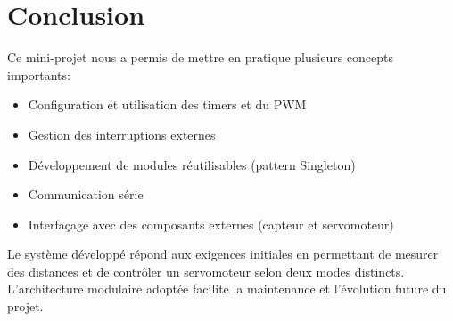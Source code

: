 \section{Conclusion}
Ce mini-projet nous a permis de mettre en pratique plusieurs concepts importants:
\begin{itemize}
    \item Configuration et utilisation des timers et du PWM
    \item Gestion des interruptions externes
    \item Développement de modules réutilisables (pattern Singleton)
    \item Communication série
    \item Interfaçage avec des composants externes (capteur et servomoteur)
\end{itemize}

Le système développé répond aux exigences initiales en permettant de mesurer des distances et de contrôler un servomoteur selon deux modes distincts. L'architecture modulaire adoptée facilite la maintenance et l'évolution future du projet.
